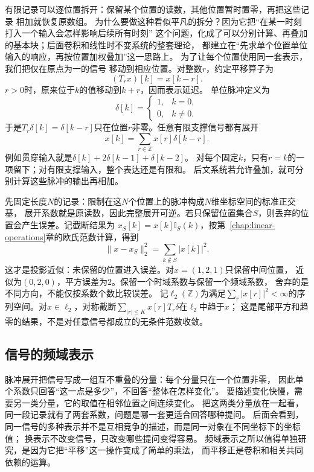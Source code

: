 有限记录可以逐位置拆开：保留某个位置的读数，其他位置暂时置零，再把这些记录
相加就恢复原数组。
为什么要做这种看似平凡的拆分？因为它把“在某一时刻打入一个输入会怎样影响后续所有时刻”
这个问题，化成了可以分别计算、再叠加的基本块；后面卷积和线性时不变系统的整套理论，
都建立在“先求单个位置单位输入的响应，再按位置加权叠加”这一思路上。
为了让每个位置使用同一套表示，我们把仅在原点为一的信号
移动到相应位置。对整数$r$，约定平移算子为
\[
  (T_rx)[k]=x[k-r].
\]
$r>0$时，原来位于$k$的值移动到$k+r$，因而表示延迟。
单位脉冲定义为
\[
  \delta[k]=
  \begin{cases}
    1,&k=0,\\
    0,&k\neq0.
  \end{cases}
\]
于是$T_r\delta[k]=\delta[k-r]$只在位置$r$非零。任意有限支撑信号都有展开
\begin{equation}
  x[k]=\sum_{r\in\mathbb Z}x[r]\delta[k-r].
  \label{eq:signal-analysis-impulse-expansion}
\end{equation}
例如贯穿输入就是$\delta[k]+2\delta[k-1]+\delta[k-2]$。
对每个固定$k$，只有$r=k$的一项留下；对有限支撑输入，整个表达还是有限和。
后文系统若允许叠加，就可分别计算这些脉冲的输出再相加。

先固定长度$N$的记录：限制在这$N$个位置上的脉冲构成$N$维坐标空间的标准正交基，
展开系数就是原读数，因此完整展开可逆。若只保留位置集合$S$，则丢弃的位置会产生误差。记截断结果为
$x_S[k]=x[k]\mathbb I_S(k)$，按第~\ref{chap:linear-operations}章的欧氏范数计算，得到
\[
  \|x-x_S\|_2^2=\sum_{k\notin S}|x[k]|^2.
\]
这才是投影近似：未保留的位置进入误差。对$x=(1,2,1)$只保留中间位置，
近似为$(0,2,0)$，平方误差为$2$。保留一个时域系数与保留一个频域系数，
舍弃的是不同方向，不能仅按系数个数比较误差。
记$\ell_2(\mathbb Z)$为满足$\sum_r|x[r]|^2<\infty$的序列空间。对$x\in\ell_2$，对称截断$\sum_{|r|\leq K}x[r]T_r\delta$在$\ell_2$中趋于$x$；
这是尾部平方和趋零的结果，不是对任意信号都成立的无条件范数收敛。

\subsection{信号的频域表示}
\label{sec:signal-analysis-frequency-representation}

脉冲展开把信号写成一组互不重叠的分量：每个分量只在一个位置非零，
因此单个系数只回答“这一点是多少”，不回答“整体在怎样变化”。
要描述变化快慢，需要另一类分量，它的取值在相邻位置之间连续变化。
把这两类分量放在一起看，同一段记录就有了两套系数，问题是哪一套更适合回答哪种提问。
后面会看到，同一信号的多种表示并不是互相竞争的描述，而是同一对象在不同坐标下的坐标值；
换表示不改变信号，只改变哪些提问变得容易。
频域表示之所以值得单独研究，是因为它把“平移”这一操作变成了简单的乘法，
而平移正是卷积和相关共同依赖的运算。

